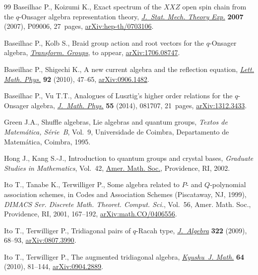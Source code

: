 \documentclass[pdftex]{sigma}
\numberwithin{equation}{section}
\begin{document}
\begin{thebibliography}{99}
Baseilhac P., Koizumi K., Exact spectrum of the {$XXZ$} open spin chain from
 the {$q$}-{O}nsager algebra representation theory, \href{https://doi.org/10.1088/1742-5468/2007/09/p09006}{\textit{J.~Stat. Mech.
 Theory Exp.}} \textbf{2007} (2007), P09006, 27~pages, \href{https://arxiv.org/abs/hep-th/0703106}{arXiv:hep-th/0703106}.

Baseilhac P., Kolb S., Braid group action and root vectors for the
 $q$-{O}nsager algebra, \href{https://doi.org/10.1007/s00031-020-09555-7}{\textit{Transform. Groups}}, {t}o appear, \href{https://arxiv.org/abs/1706.08747}{arXiv:1706.08747}.

Baseilhac P., Shigechi K., A new current algebra and the reflection equation,
 \href{https://doi.org/10.1007/s11005-010-0380-x}{\textit{Lett. Math. Phys.}} \textbf{92} (2010), 47--65, \href{https://arxiv.org/abs/0906.1482}{arXiv:0906.1482}.

Baseilhac P., Vu T.T., Analogues of {L}usztig's higher order relations for the
 {$q$}-{O}nsager algebra, \href{https://doi.org/10.1063/1.4892518}{\textit{J.~Math. Phys.}} \textbf{55} (2014), 081707,
 21~pages, \href{https://arxiv.org/abs/1312.3433}{arXiv:1312.3433}.

Green J.A., Shuffle algebras, {L}ie algebras and quantum groups, \textit{Textos
 de Matem\'atica, S\'erie~B}, Vol.~9, Universidade de Coimbra,
 Departamento de Matem\'atica, Coimbra, 1995.

Hong J., Kang S.-J., Introduction to quantum groups and crystal bases,
 \textit{Graduate Studies in Mathematics}, Vol.~42, \href{https://doi.org/10.1090/gsm/042}{Amer. Math. Soc.}, Providence, RI, 2002.

Ito T., Tanabe K., Terwilliger P., Some algebra related to {$P$}- and
 {$Q$}-polynomial association schemes, in Codes and Association Schemes
 ({P}iscataway, {NJ}, 1999), \textit{DIMACS Ser. Discrete Math. Theoret.
 Comput. Sci.}, Vol.~56, Amer. Math. Soc., Providence, RI, 2001, 167--192,
 \href{https://arxiv.org/abs/math.CO/0406556}{arXiv:math.CO/0406556}.

Ito T., Terwilliger P., Tridiagonal pairs of {$q$}-{R}acah type,
 \href{https://doi.org/10.1016/j.jalgebra.2009.04.008}{\textit{J.~Algebra}} \textbf{322} (2009), 68--93, \href{https://arxiv.org/abs/0807.3990}{arXiv:0807.3990}.

Ito T., Terwilliger P., The augmented tridiagonal algebra, \href{https://doi.org/10.2206/kyushujm.64.81}{\textit{Kyushu~J.
 Math.}} \textbf{64} (2010), 81--144, \href{https://arxiv.org/abs/0904.2889}{arXiv:0904.2889}.


\end{thebibliography}
\end{document}
